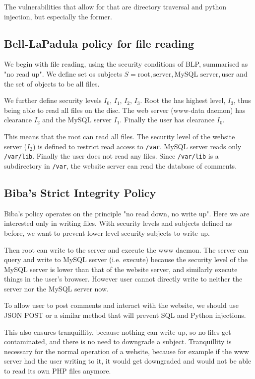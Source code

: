 \documentclass[11pt,journal]{article}
\begin{document}
	The vulnerabilities that allow for that are directory traversal and python injection, but especially the former.
	
	\subsection{Bell-LaPadula policy for file reading}
	We begin with file reading, using the security conditions of BLP, summarised as "no read up". We define set os subjects $S = {\text{root}, \text{server}, \text{MySQL server}, \text{user}}$ and the set of objects to be all files.
	
	We further define security levels $I_0$, $I_1$, $I_2$, $I_3$. Root the has highest level, $I_3$, thus being able to read all files on the disc. The web server (www-data daemon) has clearance $I_2$ and the MySQL server $I_1$. Finally the user has clearance $I_0$. 
	
	This means that the root can read all files. The security level of the website server ($I_2$) is defined to restrict read access to \texttt{/var}. MySQL server reads only \texttt{/var/lib}. Finally the user does not read any files. Since \texttt{/var/lib} is a subdirectory in \texttt{/var}, the website server can read the database of comments.
	
	\subsection{Biba's Strict Integrity Policy}
	
	Biba's policy operates on the principle "no read down, no write up". Here we are interested only in writing files. With security levels and subjects defined as before, we want to prevent lower level security subjects to write up.
	
	Then root can write to the server and execute the www daemon. The server can query and write to MySQL server (i.e. execute) because the security level of the MySQL server is lower than that of the website server, and similarly execute things in the user's browser. However user cannot directly write to neither the server nor the MySQL server now.
	
	To allow user to post comments and interact with the website, we should use JSON POST or a similar method that will prevent SQL and Python injections.
	
	This also ensures tranquillity, because nothing can write up, so no files get contaminated, and there is no need to downgrade a subject. Tranquillity is necessary for the normal operation of a website, because for example if the www server had the user writing to it, it would get downgraded and would not be able to read its own PHP files anymore.
	
\end{document}
